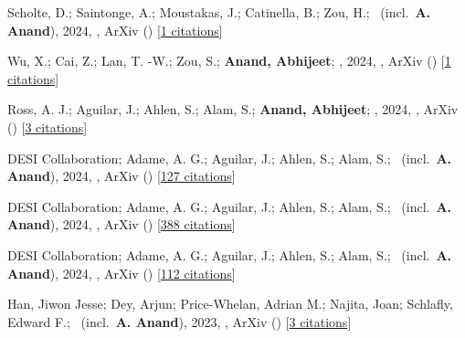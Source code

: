 \item[{\color{numcolor}\scriptsize7}] Scholte, D.; Saintonge, A.; Moustakas, J.; Catinella, B.; Zou, H.; \etal\ (incl.\ \textbf{A. Anand}), 2024, , ArXiv () [\href{https://ui.adsabs.harvard.edu/abs/2024arXiv240803996S}{1 citations}]

\item[{\color{numcolor}\scriptsize6}] Wu, X.; Cai, Z.; Lan, T. -W.; Zou, S.; \textbf{Anand, Abhijeet}; \etal, 2024, , ArXiv () [\href{https://ui.adsabs.harvard.edu/abs/2024arXiv240717809W}{1 citations}]

\item[{\color{numcolor}\scriptsize5}] Ross, A. J.; Aguilar, J.; Ahlen, S.; Alam, S.; \textbf{Anand, Abhijeet}; \etal, 2024, , ArXiv () [\href{https://ui.adsabs.harvard.edu/abs/2024arXiv240516593R}{3 citations}]

\item[{\color{numcolor}\scriptsize4}] DESI Collaboration; Adame, A. G.; Aguilar, J.; Ahlen, S.; Alam, S.; \etal\ (incl.\ \textbf{A. Anand}), 2024, , ArXiv () [\href{https://ui.adsabs.harvard.edu/abs/2024arXiv240403000D}{127 citations}]

\item[{\color{numcolor}\scriptsize3}] DESI Collaboration; Adame, A. G.; Aguilar, J.; Ahlen, S.; Alam, S.; \etal\ (incl.\ \textbf{A. Anand}), 2024, , ArXiv () [\href{https://ui.adsabs.harvard.edu/abs/2024arXiv240403002D}{388 citations}]

\item[{\color{numcolor}\scriptsize2}] DESI Collaboration; Adame, A. G.; Aguilar, J.; Ahlen, S.; Alam, S.; \etal\ (incl.\ \textbf{A. Anand}), 2024, , ArXiv () [\href{https://ui.adsabs.harvard.edu/abs/2024arXiv240403001D}{112 citations}]

\item[{\color{numcolor}\scriptsize1}] Han, Jiwon Jesse; Dey, Arjun; Price-Whelan, Adrian M.; Najita, Joan; Schlafly, Edward F.; \etal\ (incl.\ \textbf{A. Anand}), 2023, , ArXiv () [\href{https://ui.adsabs.harvard.edu/abs/2023arXiv230611784H}{3 citations}]